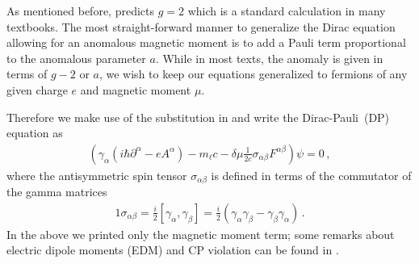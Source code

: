As mentioned before,  predicts $g\!=\!2$ which is a standard calculation in many textbooks. The most straight-forward manner to generalize the Dirac equation allowing for an anomalous magnetic moment is to add a Pauli term proportional to the anomalous parameter $a$. While in most texts, the anomaly is given in terms of $g-2$ or $a$, we wish to keep our equations generalized to fermions of any given charge $e$ and magnetic moment $\mu$. 

Therefore we make use of the substitution in  and write the Dirac-Pauli~(DP) equation as
\begin{gather}
	\label{dp:1}
    \left(\gamma_{\alpha}\left(i\hbar\partial^{\alpha} - eA^{\alpha}\right) - m_{\ell}c - \delta\mu\frac{1}{2c}\sigma_{\alpha\beta}F^{\alpha\beta}\right)\psi=0\,,
\end{gather}
where the antisymmetric spin tensor $\sigma_{\alpha\beta}$ is defined in terms of the commutator of the gamma matrices
\begin{alignat}{1}
	\label{sigma:1}
    \sigma_{\alpha\beta}=\frac{i}{2}\left[\gamma_{\alpha},\gamma_{\beta}\right]=\frac{i}{2}\left(\gamma_{\alpha}\gamma_{\beta}-\gamma_{\beta}\gamma_{\alpha}\right)\,.
\end{alignat}
In the above we printed only the magnetic moment term; some remarks about electric dipole moments (EDM) and CP violation can be found in .

